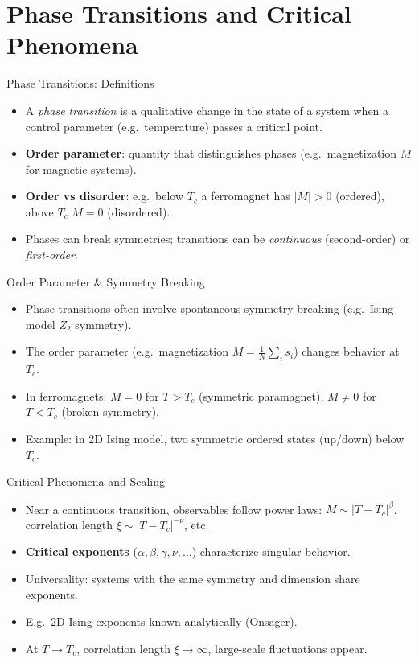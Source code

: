 \documentclass{beamer}
\begin{document}
\section{Phase Transitions and Critical Phenomena}

\begin{frame}{Phase Transitions: Definitions}
 \begin{itemize}
   \item A \emph{phase transition} is a qualitative change in the state of a system when a control parameter (e.g.\ temperature) passes a critical point.
   \item \textbf{Order parameter}: quantity that distinguishes phases (e.g.\ magnetization $M$ for magnetic systems).
   \item \textbf{Order vs disorder}: e.g.\ below $T_c$ a ferromagnet has $|M|>0$ (ordered), above $T_c$ $M=0$ (disordered).
   \item Phases can break symmetries; transitions can be \emph{continuous} (second-order) or \emph{first-order}.
 \end{itemize}
\end{frame}

\begin{frame}{Order Parameter \& Symmetry Breaking}
 \begin{itemize}
   \item Phase transitions often involve spontaneous symmetry breaking (e.g.\ Ising model $Z_2$ symmetry).
   \item The order parameter (e.g.\ magnetization $M = \frac{1}{N}\sum_i s_i$) changes behavior at $T_c$.
   \item In ferromagnets: $M=0$ for $T>T_c$ (symmetric paramagnet), $M\neq 0$ for $T<T_c$ (broken symmetry).
   \item Example: in 2D Ising model, two symmetric ordered states (up/down) below $T_c$.
 \end{itemize}
\end{frame}

\begin{frame}{Critical Phenomena and Scaling}
 \begin{itemize}
   \item Near a continuous transition, observables follow power laws: $M \sim |T-T_c|^\beta$, correlation length $\xi \sim |T-T_c|^{-\nu}$, etc.
   \item \textbf{Critical exponents} ($\alpha,\beta,\gamma,\nu,\dots$) characterize singular behavior.
   \item Universality: systems with the same symmetry and dimension share exponents.
   \item E.g.\ 2D Ising exponents known analytically (Onsager).
   \item At $T\to T_c$, correlation length $\xi\to\infty$, large-scale fluctuations appear.
 \end{itemize}
\end{frame}
\end{document}
